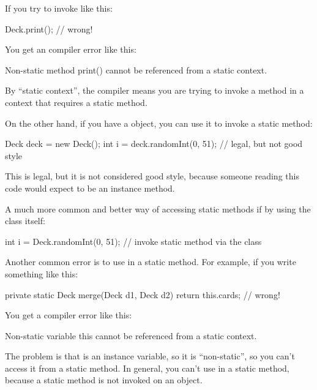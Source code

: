 If you try to invoke  like this:

\begin{code}
Deck.print();  // wrong!
\end{code}



You get an compiler error like this:

\begin{stdout}
Non-static method print() cannot be referenced from a
static context.
\end{stdout}

By ``static context'', the compiler means you are trying to invoke a method in a context that requires a static method.

On the other hand, if you have a  object, you can use it to invoke a static method:

\begin{code}
Deck deck = new Deck();
int i = deck.randomInt(0, 51);  // legal, but not good style
\end{code}

This is legal, but it is not considered good style, because someone reading this code would expect  to be an instance method.

A much more common and better way of accessing static methods if by using the class itself:

\begin{code}
int i = Deck.randomInt(0, 51);  // invoke static method via the class
\end{code}

Another common error is to use  in a static method.
For example, if you write something like this:

\begin{code}
private static Deck merge(Deck d1, Deck d2) {
    return this.cards;  // wrong!
}
\end{code}

You get a compiler error like this:

\begin{stdout}
Non-static variable this cannot be referenced from a
static context.
\end{stdout}

The problem is that  is an instance variable, so it is ``non-static'', so you can't access it from a static method.
In general, you can't use  in a static method, because a static method is not invoked on an object.


